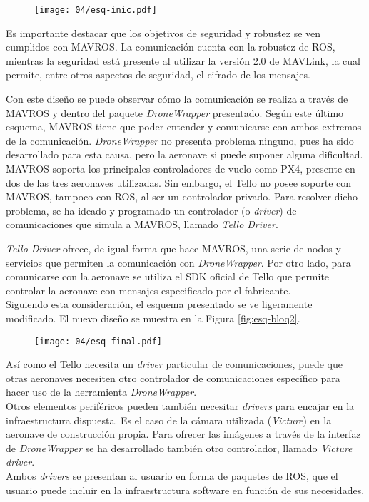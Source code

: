 \documentclass[../main.tex]{subfiles}
\begin{document}
\begin{figure}[!ht]
 	{\texttt{[image: 04/esq-inic.pdf]}}
\end{figure}

Es importante destacar que los objetivos de seguridad y robustez se ven cumplidos con MAVROS. La comunicación cuenta con la robustez de ROS, mientras la seguridad está presente al utilizar la versión 2.0 de MAVLink, la cual permite, entre otros aspectos de seguridad, el cifrado de los mensajes. 

Con este diseño se puede observar cómo la comunicación se realiza a través de MAVROS y dentro del paquete \emph{DroneWrapper} presentado. Según este último esquema, MAVROS tiene que poder entender y comunicarse con ambos extremos de la comunicación. \emph{DroneWrapper} no presenta problema ninguno, pues ha sido desarrollado para esta causa, pero la aeronave si puede suponer alguna dificultad. \\
MAVROS soporta los principales controladores de vuelo como PX4, presente en dos de las tres aeronaves utilizadas. Sin embargo, el Tello no posee soporte con MAVROS, tampoco con ROS, al ser un controlador privado. Para resolver dicho problema, se ha ideado y programado un controlador (o \emph{driver}) de comunicaciones que simula a MAVROS, llamado \emph{Tello Driver}.

\emph{Tello Driver} ofrece, de igual forma que hace MAVROS, una serie de nodos y servicios que permiten la comunicación con \emph{DroneWrapper}. Por otro lado, para comunicarse con la aeronave se utiliza el SDK oficial de Tello \cite{tello-sdk} que permite controlar la aeronave con mensajes especificado por el fabricante. \\
Siguiendo esta consideración, el esquema presentado se ve ligeramente modificado. El nuevo diseño se muestra en la Figura \ref{fig:esq-bloq2}.

\begin{figure}[!ht]
 	{\texttt{[image: 04/esq-final.pdf]}}
\end{figure}

\newpage
Así como el Tello necesita un \emph{driver} particular de comunicaciones, puede que otras aeronaves necesiten otro controlador de comunicaciones específico para hacer uso de la herramienta \emph{DroneWrapper}. \\
Otros elementos periféricos pueden también necesitar \emph{drivers} para encajar en la infraestructura dispuesta. Es el caso de la cámara utilizada (\emph{Victure}) en la aeronave de construcción propia. Para ofrecer las imágenes a través de la interfaz de \emph{DroneWrapper} se ha desarrollado también otro controlador, llamado \emph{Victure driver}. \\
Ambos \emph{drivers} se presentan al usuario en forma de paquetes de ROS, que el usuario puede incluir en la infraestructura software en función de sus necesidades. \\
\end{document}
